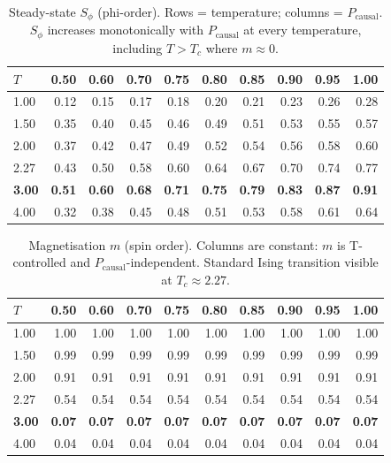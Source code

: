 \documentclass[11pt,a4paper]{article}
\begin{document}
\begin{table}[h]
\centering
\caption{Steady-state $S_\phi$ (phi-order). Rows = temperature; columns = $P_\mathrm{causal}$.
$S_\phi$ increases monotonically with $P_\mathrm{causal}$ at every temperature,
including $T>T_c$ where $m \approx 0$.}
\label{tab:sphi}
\small
\begin{tabular}{l|rrrrrrrrr}
\toprule
$T$ & 0.50 & 0.60 & 0.70 & 0.75 & 0.80 & 0.85 & 0.90 & 0.95 & 1.00 \\
\midrule
1.00 & 0.12 & 0.15 & 0.17 & 0.18 & 0.20 & 0.21 & 0.23 & 0.26 & 0.28 \\
1.50 & 0.35 & 0.40 & 0.45 & 0.46 & 0.49 & 0.51 & 0.53 & 0.55 & 0.57 \\
2.00 & 0.37 & 0.42 & 0.47 & 0.49 & 0.52 & 0.54 & 0.56 & 0.58 & 0.60 \\
2.27 & 0.43 & 0.50 & 0.58 & 0.60 & 0.64 & 0.67 & 0.70 & 0.74 & 0.77 \\
\textbf{3.00} & \textbf{0.51} & \textbf{0.60} & \textbf{0.68} & \textbf{0.71}
              & \textbf{0.75} & \textbf{0.79} & \textbf{0.83} & \textbf{0.87}
              & \textbf{0.91} \\
4.00 & 0.32 & 0.38 & 0.45 & 0.48 & 0.51 & 0.53 & 0.58 & 0.61 & 0.64 \\
\bottomrule
\end{tabular}
\end{table}

\begin{table}[h]
\centering
\caption{Magnetisation $m$ (spin order). Columns are constant: $m$ is T-controlled and
$P_\mathrm{causal}$-independent. Standard Ising transition visible at $T_c \approx 2.27$.}
\label{tab:m}
\small
\begin{tabular}{l|rrrrrrrrr}
\toprule
$T$ & 0.50 & 0.60 & 0.70 & 0.75 & 0.80 & 0.85 & 0.90 & 0.95 & 1.00 \\
\midrule
1.00 & 1.00 & 1.00 & 1.00 & 1.00 & 1.00 & 1.00 & 1.00 & 1.00 & 1.00 \\
1.50 & 0.99 & 0.99 & 0.99 & 0.99 & 0.99 & 0.99 & 0.99 & 0.99 & 0.99 \\
2.00 & 0.91 & 0.91 & 0.91 & 0.91 & 0.91 & 0.91 & 0.91 & 0.91 & 0.91 \\
2.27 & 0.54 & 0.54 & 0.54 & 0.54 & 0.54 & 0.54 & 0.54 & 0.54 & 0.54 \\
\textbf{3.00} & \textbf{0.07} & \textbf{0.07} & \textbf{0.07} & \textbf{0.07}
              & \textbf{0.07} & \textbf{0.07} & \textbf{0.07} & \textbf{0.07}
              & \textbf{0.07} \\
4.00 & 0.04 & 0.04 & 0.04 & 0.04 & 0.04 & 0.04 & 0.04 & 0.04 & 0.04 \\
\bottomrule
\end{tabular}
\end{table}
\end{document}
